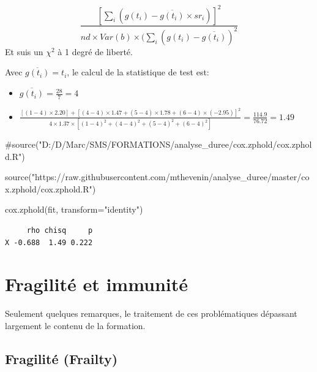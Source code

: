 \documentclass[
  12pt,
  letterpaper,
  DIV=11,
  numbers=noendperiod,
  onepage,
  openany]{scrreprt}
\newenvironment{Shaded}{\begin{snugshade}}{\end{snugshade}}
\newcommand{\AttributeTok}[1]{\textcolor[rgb]{0.80,0.80,0.80}{#1}}
\newcommand{\CommentTok}[1]{\textcolor[rgb]{0.50,0.62,0.50}{#1}}
\newcommand{\FunctionTok}[1]{\textcolor[rgb]{0.94,0.94,0.56}{#1}}
\newcommand{\NormalTok}[1]{\textcolor[rgb]{0.80,0.80,0.80}{#1}}
\newcommand{\StringTok}[1]{\textcolor[rgb]{0.80,0.58,0.58}{#1}}
\begin{document}
\[\frac{[\sum_i(g(t_i) - \overline{g(t_i)}\times sr_i)]^2}{nd \times Var(b) \times (\sum_i(g(t_i) - \overline{g(t_i)})^2}\]
Et suis un \(\chi^2\) à 1 degré de liberté.

Avec \(\overline{g(t_i)}=t_i\), le calcul de la statistique de test est:

\begin{itemize}
\item
  \(\overline{g(t_i)}= \frac{28}{7}=4\)
\item
  \(\frac{[(1-4)\times 2.20] + [(4-4)\times 1.47 + (5-4)\times 1.78 + (6-4)\times (-2.95)]^2 }{4\times 1.37 \times [(1-4)^2 + (4-4)^2 + (5-4)^2 + (6-4)^2] } = \frac{114.9}{76.72} = 1.49\)
\end{itemize}

\begin{Shaded}
\begin{Highlighting}[]
\CommentTok{\#source("D:/D/Marc/SMS/FORMATIONS/analyse\_duree/cox.zphold/cox.zphold.R")}

\FunctionTok{source}\NormalTok{(}\StringTok{"https://raw.githubusercontent.com/mthevenin/analyse\_duree/master/cox.zphold/cox.zphold.R"}\NormalTok{)}
\end{Highlighting}
\end{Shaded}

\begin{Shaded}
\begin{Highlighting}[]
\FunctionTok{cox.zphold}\NormalTok{(fit, }\AttributeTok{transform=}\StringTok{"identity"}\NormalTok{)}
\end{Highlighting}
\end{Shaded}

\begin{verbatim}
     rho chisq     p
X -0.688  1.49 0.222
\end{verbatim}

\hypertarget{fragilituxe9-et-immunituxe9}{%
\section{Fragilité et immunité}\label{fragilituxe9-et-immunituxe9}}

Seulement quelques remarques, le traitement de ces problématiques
dépassant largement le contenu de la formation.

\hypertarget{fragilituxe9-frailty}{%
\subsection{Fragilité (Frailty)}\label{fragilituxe9-frailty}}
\end{document}
